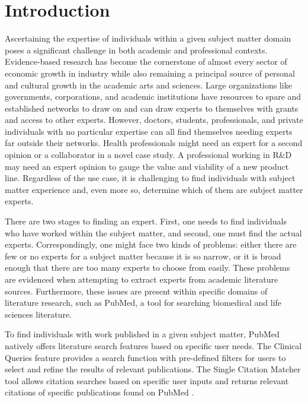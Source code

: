 \section{Introduction}

Ascertaining the expertise of individuals within a given subject matter domain poses a significant challenge in both academic and professional contexts. Evidence-based research has become the cornerstone of almost every sector of economic growth in industry while also remaining a principal source of personal and cultural growth in the academic arts and sciences. Large organizations like governments, corporations, and academic institutions have resources to spare and established networks to draw on and can draw experts to themselves with grants and access to other experts. However, doctors, students, professionals, and private individuals with no particular expertise can all find themselves needing experts far outside their networks. Health professionals might need an expert for a second opinion or a collaborator in a novel case study. A professional working in R\&D may need an expert opinion to gauge the value and viability of a new product line. Regardless of the use case, it is challenging to find individuals with subject matter experience and, even more so, determine which of them are subject matter experts.

There are two stages to finding an expert. First, one needs to find individuals who have worked within the subject matter, and second, one must find the actual experts. Correspondingly, one might face two kinds of problems: either there are few or no experts for a subject matter because it is so narrow, or it is broad enough that there are too many experts to choose from easily. These problems are evidenced when attempting to extract experts from academic literature sources. Furthermore, these issues are present within specific domains of literature research, such as PubMed, a tool for searching biomedical and life sciences literature. 

To find individuals with work published in a given subject matter, PubMed natively offers literature search features based on specific user needs. The Clinical Queries feature provides a search function with pre-defined filters for users to select and refine the results of relevant publications. The Single Citation Matcher tool allows citation searches based on specific user inputs and returns relevant citations of specific publications found on PubMed \cite{ref-pubmed-native}. 

